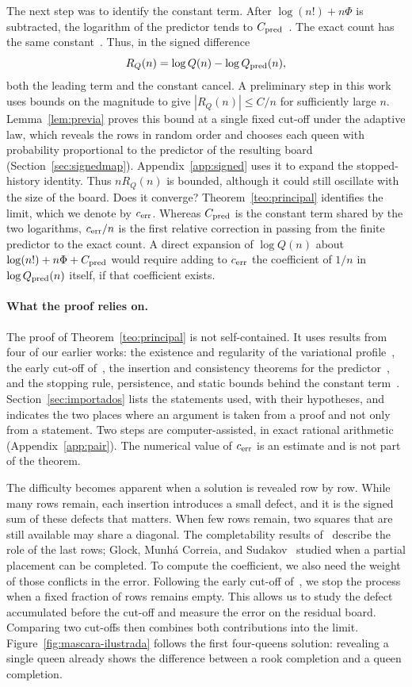 The next step was to identify the constant term. After $\log(n!)+n\Phi$ is subtracted, the logarithm of
the predictor tends to $C_{\rm pred}$~\cite{pc}. The exact count has the same constant~\cite{tc}. Thus,
in the signed difference
\[
 R_Q(n)=\log Q(n)-\log Q_{\rm pred}(n),
\]
both the leading term and the constant cancel. A preliminary step in this work uses bounds on the
magnitude to give $|R_Q(n)|\le C/n$ for sufficiently large $n$. Lemma~\ref{lem:previa} proves this bound
at a single fixed cut-off under the adaptive law, which reveals the rows in random order and chooses each
queen with probability proportional to the predictor of the resulting board
(Section~\ref{sec:signedmap}). Appendix~\ref{app:signed} uses it to expand the
stopped-history identity. Thus $nR_Q(n)$ is bounded, although it could still oscillate with the size of
the board. Does it converge? Theorem~\ref{teo:principal} identifies the limit, which we denote by
\(c_{\mathrm{err}}\). Whereas \(C_{\rm pred}\) is the constant term shared by the two logarithms, \(c_{\mathrm{err}}/n\) is the
first relative correction in passing from the finite predictor to the exact count. A direct expansion of
\(\log Q(n)\) about \(\log(n!)+n\Phi+C_{\rm pred}\) would require adding to \(c_{\mathrm{err}}\) the coefficient of
\(1/n\) in \(\log Q_{\rm pred}(n)\) itself, if that coefficient exists.

\paragraph{What the proof relies on.} The proof of Theorem~\ref{teo:principal} is not self-contained. It
uses results from four of our earlier works: the existence and regularity of the variational
profile~\cite{pv}, the early cut-off of~\cite{ef}, the insertion and consistency theorems for the
predictor~\cite{pc}, and the stopping rule, persistence, and static bounds behind the constant
term~\cite{tc}. Section~\ref{sec:importados} lists the statements used, with their
hypotheses, and indicates the two places where an argument is taken from a proof and not only from a
statement. Two steps are computer-assisted, in exact rational arithmetic (Appendix~\ref{app:pair}). The
numerical value of \(c_{\mathrm{err}}\) is an estimate and is not part of the theorem.

The difficulty becomes apparent when a solution is revealed row by row. While many rows remain, each
insertion introduces a small defect, and it is the signed sum of these defects that matters. When few
rows remain, two squares that are still available may share a diagonal. The completability results
of~\cite{ef} describe the role of the last rows; Glock, Munhá Correia, and Sudakov~\cite{gms} studied
when a partial placement can be completed. To compute the coefficient, we also need the weight of those
conflicts in the error. Following the early cut-off of~\cite{ef}, we stop the process when a fixed
fraction of rows remains empty. This allows us to study the defect accumulated before the cut-off and
measure the error on the residual board. Comparing two cut-offs then combines both contributions into the
limit. Figure~\ref{fig:mascara-ilustrada} follows the first four-queens solution: revealing a single queen
already shows the difference between a rook completion and a queen completion.

